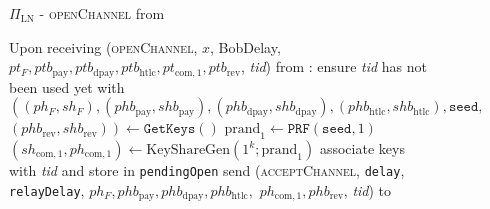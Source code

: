 \begin{figure}[H]
  \begin{protocolbox}{$\Pi_{\mathrm{LN}}$ - \textsc{openChannel} from \bob}
    \begin{algorithmic}[1]
      \State Upon receiving (\textsc{openChannel}, $x$, BobDelay, $pt_F,
      ptb_{\mathrm{pay}}, ptb_{\mathrm{dpay}}, ptb_{\mathrm{htlc}},
      pt_{\mathrm{com}, 1}, ptb_{\mathrm{rev}}$, \textit{tid}) from \bob:
      \Indent
        \State ensure \textit{tid} has not been used yet with \bob
        \State $\left(\left(ph_F, sh_F\right), \left(phb_{\mathrm{pay}},
        shb_{\mathrm{pay}}\right), \left(phb_{\mathrm{dpay}},
        shb_{\mathrm{dpay}}\right), \left(phb_{\mathrm{htlc}},
        shb_{\mathrm{htlc}}\right), \mathtt{seed},\right.$
        $\left.\left(phb_{\mathrm{rev}}, shb_{\mathrm{rev}}\right)\right) \gets
        \texttt{GetKeys}\left(\right)$
        \State $\mathrm{prand}_1 \gets \texttt{PRF}\left(\mathtt{seed},
        1\right)$
        \State $\left(sh_{\mathrm{com}, 1}, ph_{\mathrm{com}, 1}\right) \gets
        \mathrm{KeyShareGen}\left(1^k; \mathrm{prand}_1\right)$
        \State associate keys with \textit{tid} and store in
        \texttt{pendingOpen}
        \State send (\textsc{acceptChannel}, \texttt{delay},
        \texttt{relayDelay}, $ph_F, phb_{\mathrm{pay}}, phb_{\mathrm{dpay}},
        phb_{\mathrm{htlc}},$ $ph_{\mathrm{com}, 1}, phb_{\mathrm{rev}}$,
        \textit{tid}) to \bob{}
      \EndIndent
    \end{algorithmic}
  \end{protocolbox}
  \caption{}
  \label{alg:protocol:open:openChannel}
\end{figure}

